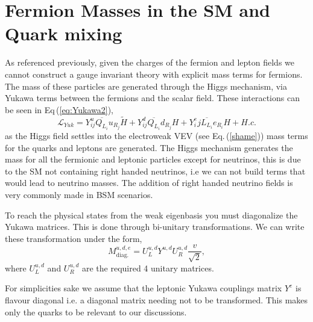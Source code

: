 \renewcommand{\cleardoublepage}{}
\renewcommand{\clearpage}{}

\section{Fermion Masses in the SM and Quark mixing}

As referenced previously, given the charges of the fermion and lepton fields we cannot construct a gauge invariant theory with explicit mass terms for fermions. 
%
The mass of these particles are generated through the Higgs mechanism, via Yukawa terms between the fermions and the scalar field. 
%
These interactions can be seen in Eq\,(\ref{eq:Yukawa2}), 
%
\begin{equation} 
\label{eq:Yukawa2}
\mathcal{L}_{Yuk} = Y^u_{ij} \overline{Q_{L_i}} u_{R_j}  \tilde{H} + Y^d_{ij} \overline{Q_{L_i}}  d_{R_j} H  + Y^e_ij \overline{L_{L_i}}  e_{R_i} H + H.c. 
\end{equation} 
%
as the Higgs field settles into the electroweak VEV (see Eq.\,(\ref{shame})) mass terms for the quarks and leptons are generated. 
%
The Higgs mechanism generates the mass for all the fermionic and leptonic particles except for neutrinos, this is due to the SM not containing right handed neutrinos, i.e we can not build terms that would lead to neutrino masses.
% 
The addition of right handed neutrino fields is very commonly made in BSM scenarios. 

To reach the physical states from the weak eigenbasis you must diagonalize the Yukawa matrices. This is done through bi-unitary transformations. 
% 
We can write these transformation under the form,
%
\begin{equation}
\label{YukawaMasses} 
M^{u,d,e}_{\text{diag.}}= U^{u,d}_L Y^{u,d} U^{u,d}_R \frac{v}{\sqrt{2}} , 
\end{equation} 
%
where $U^{u,d}_L$ and $U^{u,d}_R$ are the required 4 unitary matrices. 

%
%
For simplicities sake we assume that the leptonic Yukawa couplings matrix $Y^{e}$ is flavour diagonal i.e. a diagonal matrix needing not to be transformed. This makes only the quarks to be relevant to our discussions.  

